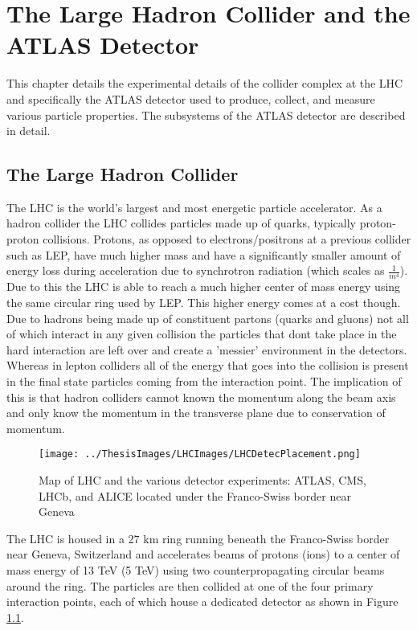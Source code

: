 
\chapter{The Large Hadron Collider and the ATLAS Detector}
\label{ch:LHCDetector}

This chapter details the experimental details of the collider complex at the LHC and specifically the ATLAS detector used to produce, collect, and measure various particle properties.  The subsystems of the ATLAS detector are described in detail.
\section{The Large Hadron Collider}
\label{Section:LHC}
The LHC is the world's largest and most energetic particle accelerator.  As a hadron collider the LHC collides particles made up of quarks, typically proton-proton collisions.  Protons, as opposed to electrons/positrons at a previous collider such as LEP, have much higher mass and have a significantly smaller amount of energy loss during acceleration due to synchrotron radiation (which scales as $\frac{1}{m^4}$).  Due to this the LHC is able to reach a much higher center of mass energy using the same circular ring used by LEP.  
This higher energy comes at a cost though.  Due to hadrons being made up of constituent partons (quarks and gluons) not all of which interact in any given collision the particles that dont take place in the hard interaction are left over and create a 'messier' environment in the detectors.  Whereas in lepton colliders all of the energy that goes into the collision is present in the final state particles coming from the interaction point.  The implication of this is that hadron colliders cannot known the momentum along the beam axis and only know the momentum in the transverse plane due to conservation of momentum.

\begin{figure}[h!]
	\centering
	\texttt{[image: ../ThesisImages/LHCImages/LHCDetecPlacement.png]}
	\caption[Map of LHC and the various detector experiments: ATLAS, CMS, LHCb, and ALICE located under the Franco-Swiss border near Geneva]{Map of LHC and the various detector experiments: ATLAS, CMS, LHCb, and ALICE  located under the Franco-Swiss border near Geneva\cite{ATLASCoords}}
	\label{fig:LHCDetPlace}
\end{figure}

The LHC is housed in a 27 km ring running beneath the Franco-Swiss border near Geneva, Switzerland and accelerates beams of protons (ions) to a center of mass energy of 13 TeV (5 TeV) using two counterpropagating circular beams around the ring.  The particles are then collided at one of the four primary interaction points, each of which house a dedicated detector as shown in Figure \ref{fig:LHCDetPlace}. 

